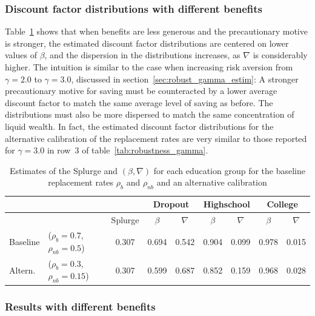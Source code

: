 \documentclass[../HAFiscal]{subfiles}
\begin{document}
\subsubsection{Discount factor distributions with different benefits}
\label{sec:robust_benefits_estim}

Table~\ref{tab:robustness_benefits} shows that when benefits are less generous and the precautionary motive is stronger, the estimated discount factor distributions are centered on lower values of $\beta$, and the dispersion in the distributions increases, as $\nabla$ is considerably higher. The intuition is similar to the case when increasing risk aversion from $\gamma=2.0$ to $\gamma=3.0$, discussed in section~\ref{sec:robust_gamma_estim}: A stronger precautionary motive for saving must be counteracted by a lower average discount factor to match the same average level of saving as before. The distributions must also be more dispersed to match the same concentration of liquid wealth. In fact, the estimated discount factor distributions for the alternative calibration of the replacement rates are very similar to those reported for $\gamma=3.0$ in row~3 of table~\ref{tab:robustness_gamma}. 

\begin{table}[t]
\begin{center}
	\begin{tabular}{llc|cccccc} 
		\toprule
		& & & \multicolumn{2}{c}{Dropout} & \multicolumn{2}{c}{Highschool} & \multicolumn{2}{c}{College} \\ \midrule 
		& & Splurge & $\beta$ & $\nabla$ & $\beta$ & $\nabla$ & $\beta$ & $\nabla$ \\ \midrule 
		Baseline & ($\rho_{b}=0.7$, $\rho_{nb}=0.5$) & 0.307 & 0.694 & 0.542 & 0.904 & 0.099 & 0.978 & 0.015 \\ 
		Altern. & ($\rho_{b}=0.3$,  $\rho_{nb}=0.15$) & 0.307 & 0.599 & 0.687 & 0.852 & 0.159 & 0.968 & 0.028
		\\ \bottomrule 
	\end{tabular}
\end{center}
\caption{Estimates of the Splurge and $(\beta,\nabla)$ for each education group for the baseline replacement rates $\rho_{b}$ and $\rho_{nb}$ and an alternative calibration}
\label{tab:robustness_benefits}
\end{table}


\FloatBarrier
\subsubsection{Results with different benefits}
\label{sec:robust_benefits_results}
\end{document}
